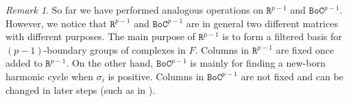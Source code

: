 \documentclass[10pt,a4paper]{amsart}
\theoremstyle{definition}
\newcommand{\red}{\color{red}}
\newcommand{\filt}{F}
\newcommand{\Chnmat}{\mathtt{SC}}
\newcommand{\Bndmat}{\mathtt{BoC}}
\newcommand{\Rmat}{\mathtt{R}}
\newcommand{\sG}{\sigma}
\theoremstyle{remark}
\newtheorem{remark}[theorem]{Remark}
\begin{document}
\begin{remark}
So far we have performed analogous operations on 
$\Rmat^{p-1}$ and $\Bndmat^{p-1}$.
However,
we notice that $\Rmat^{p-1}$ and $\Bndmat^{p-1}$
are in general two different matrices with different purposes.
The main purpose of $\Rmat^{p-1}$ is to form a filtered 
basis for  $({p-1})$-boundary groups
of  complexes in $\filt$.
Columns in $\Rmat^{p-1}$ are {fixed}
once added to $\Rmat^{p-1}$.
On the other hand,
 $\Bndmat^{p-1}$ is mainly for 
finding a new-born harmonic cycle when $\sG_i$ is positive.
Columns in
$\Bndmat^{p-1}$
are not fixed and can be changed in later steps
(such as in ).
\end{remark}
\end{document}

